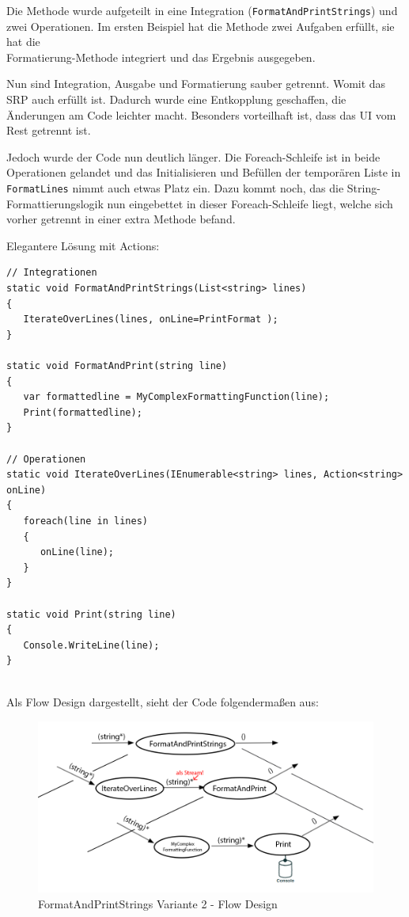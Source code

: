 Die Methode wurde aufgeteilt in eine Integration (\texttt{FormatAndPrintStrings}) und zwei Operationen.
Im ersten Beispiel hat die Methode zwei Aufgaben erfüllt, sie hat die \\ Formatierung-Methode integriert und
das Ergebnis ausgegeben.

Nun sind Integration, Ausgabe und Formatierung sauber getrennt.
Womit das SRP auch erfüllt ist. Dadurch wurde eine Entkopplung geschaffen, 
die Änderungen am Code leichter macht. Besonders vorteilhaft ist, dass das UI vom Rest getrennt ist. 

Jedoch wurde der Code nun deutlich länger. Die Foreach-Schleife ist in beide Operationen gelandet und das Initialisieren und
Befüllen der temporären Liste in \texttt{FormatLines} nimmt auch etwas Platz ein.
Dazu kommt noch, das die String-Formattierungslogik nun eingebettet in dieser Foreach-Schleife liegt, welche sich vorher getrennt in
einer extra Methode  befand.

\bigskip

Elegantere Lösung mit Actions:
\\
\begin{lstlisting}[caption=FormatAndPrintStrings Variante 2]
// Integrationen
static void FormatAndPrintStrings(List<string> lines)
{
   IterateOverLines(lines, onLine=PrintFormat );
}

static void FormatAndPrint(string line)
{
   var formattedline = MyComplexFormattingFunction(line);
   Print(formattedline);
}

// Operationen
static void IterateOverLines(IEnumerable<string> lines, Action<string> onLine)
{
   foreach(line in lines)
   {
      onLine(line);
   }
}

static void Print(string line)
{
   Console.WriteLine(line);
}


\end{lstlisting}

Als Flow Design dargestellt, sieht der Code folgendermaßen aus:

\begin{figure}[H]
	\centering
	\includegraphics[width=1\linewidth]{./img/FlowsForeach.png}
	\caption{FormatAndPrintStrings Variante 2 - Flow Design}
\end{figure}



